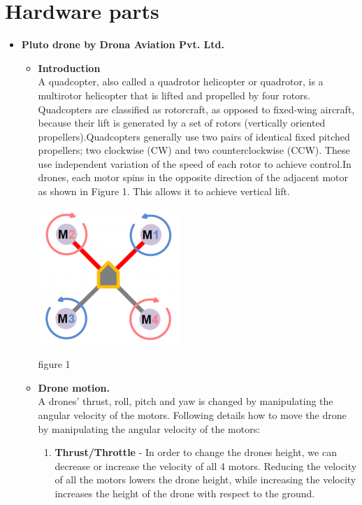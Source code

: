 \documentclass[a4paper,12pt,oneside]{book}
\begin{document}
\section{Hardware parts}
\begin{itemize}
  \item \textbf{Pluto drone by Drona Aviation Pvt. Ltd.}
    \begin{itemize}
        \item \textbf{Introduction}\\
        A quadcopter, also called a quadrotor helicopter or quadrotor, is a multirotor helicopter that is lifted and propelled by four rotors. Quadcopters are classified as rotorcraft, as opposed to fixed-wing aircraft, because their lift is generated by a set of rotors (vertically oriented propellers).Quadcopters generally use two pairs of identical fixed pitched propellers; two clockwise (CW) and two counterclockwise (CCW). These use independent variation of the speed of each rotor to achieve control.In drones, each motor spins in the opposite direction of the adjacent motor as shown in Figure 1. This allows it to achieve vertical lift.
        \begin{center}
         \includegraphics{quad_rotor.png}
        \end{center}
       \begin{center}
           figure 1
       \end{center}
        \item \textbf{Drone motion.}\\
        A drones’ thrust, roll, pitch and yaw is changed by manipulating the angular velocity of the motors. Following details how to move the drone by manipulating the angular velocity of the motors:
        \begin{enumerate}[I]
            \item \textbf{Thrust/Throttle}
             - In order to change the drones height, we can decrease or increase the velocity of all 4 motors. Reducing the velocity of all the motors lowers the drone height, while increasing the velocity increases the height of the drone with respect to the ground.

\end{enumerate}
\end{itemize}
\end{itemize}
\end{document}
